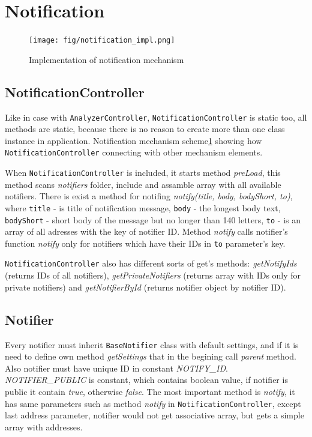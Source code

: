 \section{Notification}

\begin{figure}[hb]
  \centering
    \texttt{[image: fig/notification\_impl.png]}
  \caption{Implementation of notification mechanism}
  \label{fig:not_impl}
\end{figure}

\subsection{NotificationController}

Like in case with \texttt{AnalyzerController}, \texttt{NotificationController} is static too, all methods are static, because there is no reason to create more than one class instance in application. Notification mechanism scheme\ref{fig:not_impl} showing how \texttt{NotificationController} connecting with other mechanism elements.

When \texttt{NotificationController} is included, it starts method \emph{preLoad}, this method scans \emph{notifiers} folder, include and assamble array with all available notifiers. There is exist a method for notifing \emph{notify(title, body, bodyShort, to)}, where \texttt{title} - is title of notification message, \texttt{body} - the longest body text, \texttt{bodyShort} - short body of the message but no longer than 140 letters, \texttt{to} - is an array of all adresses with the key of notifier ID. Method \emph{notify} calls notifier's function \emph{notify} only for notifiers which have their IDs in \texttt{to} parameter's key.

\texttt{NotificationController} also has different sorts of get's methods: \emph{getNotifyIds} (returns IDs of all notifiers), \emph{getPrivateNotifiers} (returns array with IDs only for private notifiers) and \emph{getNotifierById} (returns notifier object by notifier ID).

\subsection{Notifier}

Every notifier must inherit \texttt{BaseNotifier} class with default settings, and if it is need to define own method \emph{getSettings} that in the begining call \emph{parent} method. Also notifier must have unique ID in constant \emph{NOTIFY\_ID}. \emph{NOTIFIER\_PUBLIC} is constant, which contains boolean value, if notifier is public it contain \emph{true}, otherwise \emph{false}. The most important method is \emph{notify}, it has same parameters such as method \emph{notify} in \texttt{NotificationController}, except last address parameter, notifier would not get associative array, but gets a simple array with addresses.


